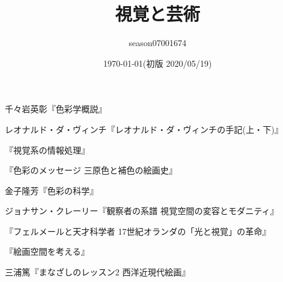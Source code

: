 \documentclass{jsarticle}
\title{視覚と芸術}
\author{season07001674}
\date{\today(初版 2020/05/19)}
\begin{document}
\maketitle
\tableofcontents


\begin{thebibliography}{99}
	\item 千々岩英彰『色彩学概説』
	\item レオナルド・ダ・ヴィンチ『レオナルド・ダ・ヴィンチの手記(上・下)』
	\item 『視覚系の情報処理』
	\item 『色彩のメッセージ 三原色と補色の絵画史』
	\item 金子隆芳『色彩の科学』
	\item ジョナサン・クレーリー『観察者の系譜 視覚空間の変容とモダニティ』
	\item 『フェルメールと天才科学者 17世紀オランダの「光と視覚」の革命』
	\item 『絵画空間を考える』
	\item 三浦篤『まなざしのレッスン2 西洋近現代絵画』
\end{thebibliography}
\end{document}
